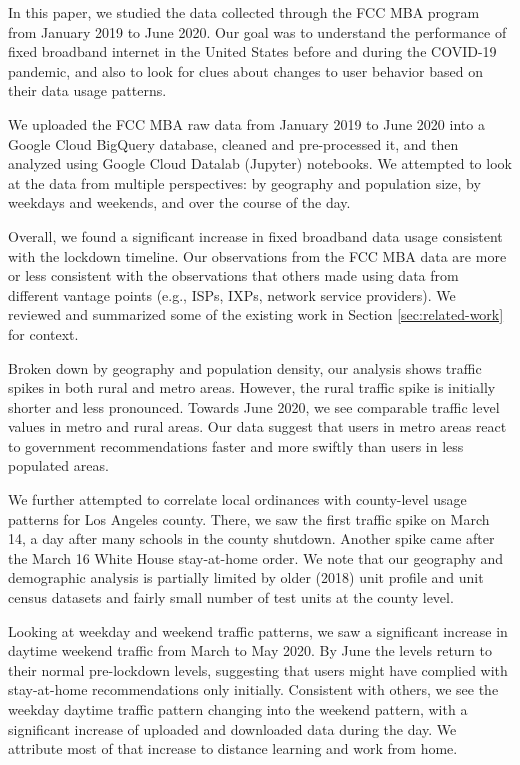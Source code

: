 \documentclass[conference,10pt]{IEEEtran}
\begin{document}
In this paper, we studied the data collected through the FCC MBA program from January 2019 to June 2020. Our goal was to understand the performance of fixed broadband internet in the United States before and during the COVID-19 pandemic, and also to look for clues about changes to user behavior based on their data usage patterns.

We uploaded the FCC MBA raw data from January 2019 to June 2020 into a Google Cloud BigQuery database, cleaned and pre-processed it, and then analyzed using Google Cloud Datalab (Jupyter) notebooks. We attempted to look at the data from multiple perspectives: by geography and population size, by weekdays and weekends, and over the course of the day.

Overall, we found a significant increase in fixed broadband data usage consistent with the lockdown timeline. Our observations from the FCC MBA data are more or less consistent with the observations that others made using data from different vantage points (e.g., ISPs, IXPs, network service providers). We reviewed and summarized some of the existing work in Section \ref{sec:related-work} for context.

Broken down by geography and population density, our analysis shows traffic spikes in both rural and metro areas. However, the rural traffic spike is initially shorter and less pronounced. Towards June 2020, we see comparable traffic level values in metro and rural areas. Our data suggest that users in metro areas react to government recommendations faster and more swiftly than users in less populated areas.

We further attempted to correlate local ordinances with county-level usage patterns for Los Angeles county. There, we saw the first traffic spike on March 14, a day after many schools in the county shutdown. Another spike came after the March 16 White House stay-at-home order. We note that our geography and demographic analysis is partially limited by older (2018) unit profile and unit census datasets and fairly small number of test units at the county level.

Looking at weekday and weekend traffic patterns, we saw a significant increase in daytime weekend traffic from March to May 2020. By June the levels return to their normal pre-lockdown levels, suggesting that users might have complied with stay-at-home recommendations only initially. Consistent with others, we see the weekday daytime traffic pattern changing into the weekend pattern, with a significant increase of uploaded and downloaded data during the day. We attribute most of that increase to distance learning and work from home.
\end{document}
